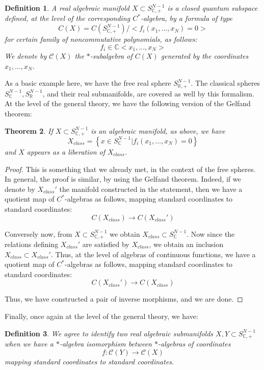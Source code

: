 \documentclass[12pt]{amsbook}
\newtheorem{theorem}{Theorem}[chapter]
\newtheorem{definition}[theorem]{Definition}
\begin{document}
\begin{definition}
A real algebraic manifold $X\subset S^{N-1}_{\mathbb C,+}$ is a closed quantum subspace defined, at the level of the corresponding $C^*$-algebra, by a formula of type
$$C(X)=C(S^{N-1}_{\mathbb C,+})\Big/\Big<f_i(x_1,\ldots,x_N)=0\Big>$$
for certain family of noncommutative polynomials, as follows:
$$f_i\in\mathbb C<x_1,\ldots,x_N>$$
We denote by $\mathcal C(X)$ the $*$-subalgebra of $C(X)$ generated by the coordinates $x_1,\ldots,x_N$. 
\end{definition}

As a basic example here, we have the free real sphere $S^{N-1}_{\mathbb R,+}$. The classical spheres $S^{N-1}_\mathbb C,S^{N-1}_\mathbb R$, and their real submanifolds, are covered as well by this formalism. At the level of the general theory, we have the following version of the Gelfand theorem:

\begin{theorem}
If $X\subset S^{N-1}_{\mathbb C,+}$ is an algebraic manifold, as above, we have
$$X_{class}=\left\{x\in S^{N-1}_\mathbb C\Big|f_i(x_1,\ldots,x_N)=0\right\}$$
and $X$ appears as a liberation of $X_{class}$.
\end{theorem}

\begin{proof}
This is something that we already met, in the context of the free spheres. In general, the proof is similar, by using the Gelfand theorem. Indeed, if we denote by $X_{class}'$ the manifold constructed in the statement, then we have a quotient map of $C^*$-algebras as follows, mapping standard coordinates to standard coordinates:
$$C(X_{class})\to C(X_{class}')$$

Conversely now, from $X\subset S^{N-1}_{\mathbb C,+}$ we obtain $X_{class}\subset S^{N-1}_\mathbb C$. Now since the relations defining $X_{class}'$ are satisfied by $X_{class}$, we obtain an inclusion $X_{class}\subset X_{class}'$. Thus, at the level of algebras of continuous functions, we have a quotient map of $C^*$-algebras as follows, mapping standard coordinates to standard coordinates:
$$C(X_{class}')\to C(X_{class})$$

Thus, we have constructed a pair of inverse morphisms, and we are done.
\end{proof}

Finally, once again at the level of the general theory, we have:

\begin{definition}
We agree to identify two real algebraic submanifolds $X,Y\subset S^{N-1}_{\mathbb C,+}$ when we have a $*$-algebra isomorphism between $*$-algebras of coordinates
$$f:\mathcal C(Y)\to\mathcal C(X)$$
mapping standard coordinates to standard coordinates.
\end{definition}
\end{document}
